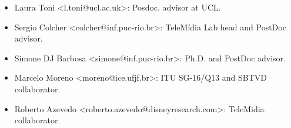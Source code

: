 \begin{itemize}[nosep]
  \item Laura Toni <l.toni@ucl.ac.uk>: Posdoc. advisor at UCL.
  
  \item Sergio Colcher <colcher@inf.puc-rio.br>: TeleMídia Lab head and PostDoc advisor.
  
  \item Simone DJ Barbosa <simone@inf.puc-rio.br>: Ph.D. and PostDoc advisor.
  
  \item Marcelo Moreno <moreno@ice.ufjf.br>: ITU SG-16/Q13 and SBTVD collaborator. 
  
  \item Roberto Azevedo <roberto.azevedo@disneyresearch.com>: TeleMidia collaborator. 
  
  
  
\end{itemize}